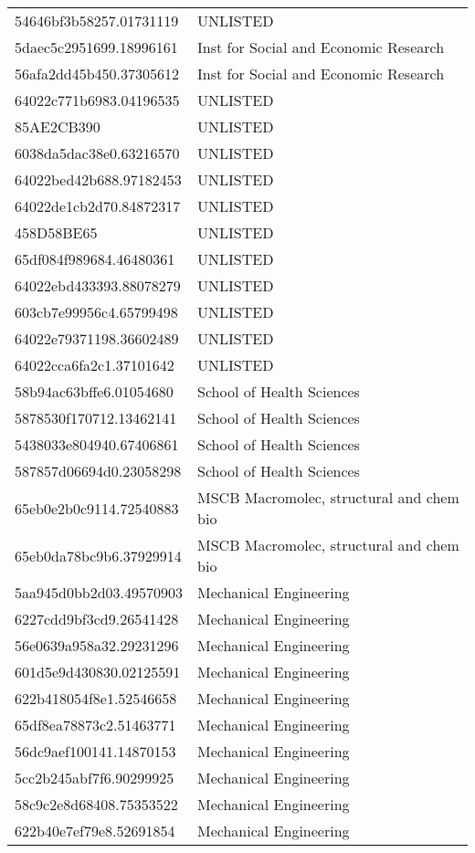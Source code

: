 \begin{tabular}{ll}
54646bf3b58257.01731119 & UNLISTED \\
5daec5c2951699.18996161 & Inst for Social and Economic Research \\
56afa2dd45b450.37305612 & Inst for Social and Economic Research \\
64022c771b6983.04196535 & UNLISTED \\
85AE2CB390 & UNLISTED \\
6038da5dac38e0.63216570 & UNLISTED \\
64022bed42b688.97182453 & UNLISTED \\
64022de1cb2d70.84872317 & UNLISTED \\
458D58BE65 & UNLISTED \\
65df084f989684.46480361 & UNLISTED \\
64022ebd433393.88078279 & UNLISTED \\
603cb7e99956c4.65799498 & UNLISTED \\
64022e79371198.36602489 & UNLISTED \\
64022cca6fa2c1.37101642 & UNLISTED \\
58b94ac63bffe6.01054680 & School of Health Sciences \\
5878530f170712.13462141 & School of Health Sciences \\
5438033e804940.67406861 & School of Health Sciences \\
587857d06694d0.23058298 & School of Health Sciences \\
65eb0e2b0c9114.72540883 & MSCB Macromolec, structural and chem bio \\
65eb0da78bc9b6.37929914 & MSCB Macromolec, structural and chem bio \\
5aa945d0bb2d03.49570903 & Mechanical Engineering \\
6227cdd9bf3cd9.26541428 & Mechanical Engineering \\
56e0639a958a32.29231296 & Mechanical Engineering \\
601d5e9d430830.02125591 & Mechanical Engineering \\
622b418054f8e1.52546658 & Mechanical Engineering \\
65df8ea78873c2.51463771 & Mechanical Engineering \\
56dc9aef100141.14870153 & Mechanical Engineering \\
5cc2b245abf7f6.90299925 & Mechanical Engineering \\
58c9c2e8d68408.75353522 & Mechanical Engineering \\
622b40e7ef79e8.52691854 & Mechanical Engineering \\

\end{tabular}
